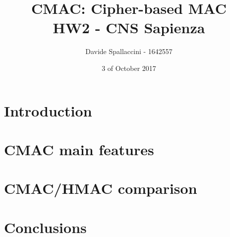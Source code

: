 \documentclass[11pt]{article}
\begin{document}
\title{CMAC: Cipher-based MAC\\ HW2 - CNS Sapienza}
\author{Davide Spallaccini - 1642557}
\date{3 of October 2017}
\maketitle


\section{Introduction}


\section{CMAC main features}


\section{CMAC/HMAC comparison}


\section{Conclusions}
\end{document}
